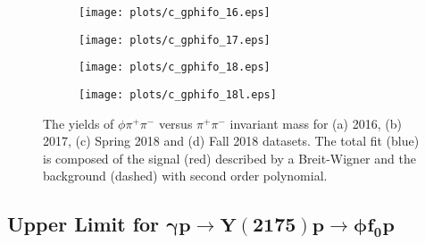 \begin{center}
\null
\vfill
\begin{figure}[htbp]
    \centering
    \begin{subfigure}[b]{0.49\textwidth}
        \texttt{[image: plots/c\_gphifo\_16.eps]}
        \caption{}
        \label{fig.y2175.xsec_ul.phifo.3.a}
    \end{subfigure}
    \begin{subfigure}[b]{0.49\textwidth}
        \texttt{[image: plots/c\_gphifo\_17.eps]}
        \caption{}
        \label{fig.y2175.xsec_ul.phifo.3.b}
    \end{subfigure}
    \begin{subfigure}[b]{0.49\textwidth}
        \texttt{[image: plots/c\_gphifo\_18.eps]}
        \caption{}
        \label{fig.y2175.xsec_ul.phifo.3.c}
    \end{subfigure}
    \begin{subfigure}[b]{0.49\textwidth}
        \texttt{[image: plots/c\_gphifo\_18l.eps]}
        \caption{}
        \label{fig.y2175.xsec_ul.phifo.3.d}
    \end{subfigure}
    \caption{The yields of $\phi \pi^+ \pi^-$ versus $\pi^+ \pi^-$ invariant mass for (a) 2016, (b) 2017, (c) Spring 2018 and (d) Fall 2018 datasets. The total fit (blue) is composed of the signal (red) described by a Breit-Wigner and the background (dashed) with second order polynomial.}
    \label{fig.y2175.xsec_ul.phifo.3}
\end{figure}
\null
\vfill
\end{center}

\newpage
\subsection{Upper Limit for \texorpdfstring{$\bm{\gamma p \rightarrow Y(2175) p \rightarrow \phi f_0 p}$}{}}
\label{chap.y2175.xsec_ul.yphifo}

